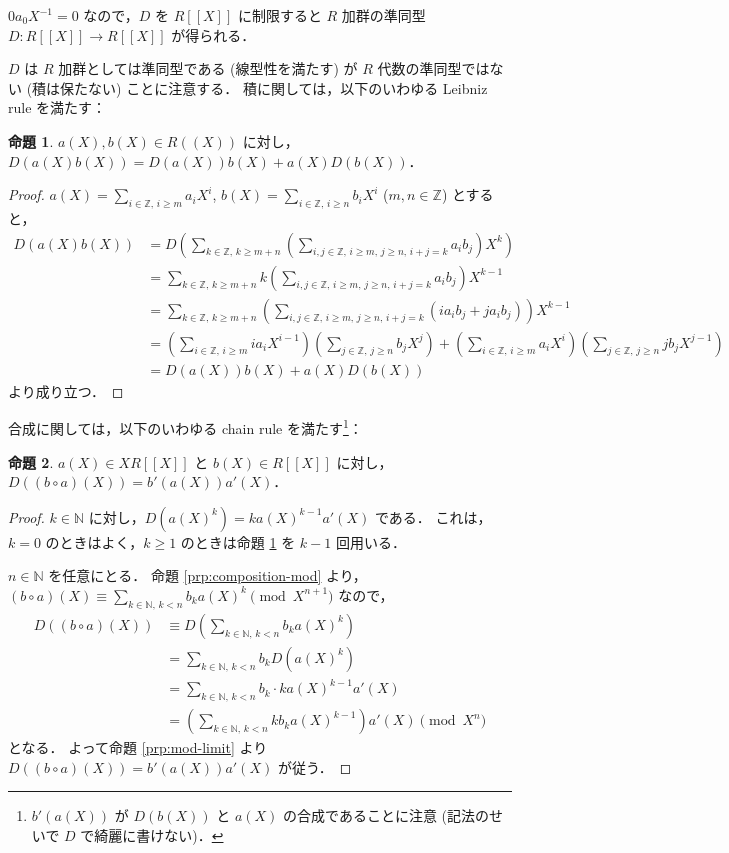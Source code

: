 \documentclass{jsarticle}
\newcommand{\N}{\mathbb{N}}
\newcommand{\Z}{\mathbb{Z}}
\newcommand{\longto}{\longrightarrow}
\theoremstyle{definition}
\newtheorem{Prp}{命題}
\newenvironment{prp}{\vspace{1ex}\begin{screen}\begin{Prp}}{\end{Prp}\end{screen}}
\newenvironment{prf}{\begin{leftbar}\begin{proof}}{\end{proof}\end{leftbar}}
\begin{document}
$0 a_0 X^{-1} = 0$ なので，$D$ を $R[[X]]$ に制限すると
$R$ 加群の準同型 $D\colon R[[X]] \longto R[[X]]$ が得られる．

$D$ は $R$ 加群としては準同型である (線型性を満たす) が
$R$ 代数の準同型ではない (積は保たない) ことに注意する．
積に関しては，以下のいわゆる Leibniz rule を満たす：

\begin{prp}
  \label{prp:leibniz}
  $a(X), b(X) \in R((X))$ に対し，$D(a(X) b(X)) = D(a(X)) b(X) + a(X) D(b(X))$．
\end{prp}
\begin{prf}
  $a(X) = \sum_{i\in\Z,\,i\ge m} a_i X^i$, $b(X) = \sum_{i\in\Z,\,i\ge n} b_i X^i$ ($m, n \in \Z$) とすると，
  \begin{align*}
    D(a(X) b(X))
    &= D\left(\sum_{k\in\Z,\,k\ge m+n} \left(\sum_{i,j\in\Z,\,i\ge m,\,j\ge n,\,i+j=k} a_i b_j\right) X^k\right) \\
    &= \sum_{k\in\Z,\,k\ge m+n} k \left(\sum_{i,j\in\Z,\,i\ge m,\,j\ge n,\,i+j=k} a_i b_j\right) X^{k-1} \\
    &= \sum_{k\in\Z,\,k\ge m+n} \left(\sum_{i,j\in\Z,\,i\ge m,\,j\ge n,\,i+j=k} (i a_i b_j + j a_i b_j)\right) X^{k-1} \\
    &= \left(\sum_{i\in\Z,\,i\ge m} i a_i X^{i-1}\right) \left(\sum_{j\in\Z,\,j\ge n} b_j X^j\right)
        + \left(\sum_{i\in\Z,\,i\ge m} a_i X^i\right) \left(\sum_{j\in\Z,\,j\ge n} j b_j X^{j-1}\right) \\
    &= D(a(X)) b(X) + a(X) D(b(X))
  \end{align*}
  より成り立つ．
\end{prf}

合成に関しては，以下のいわゆる chain rule を満たす\footnote{$b'(a(X))$ が $D(b(X))$ と $a(X)$ の合成であることに注意 (記法のせいで $D$ で綺麗に書けない)．}：

\begin{prp}
  $a(X) \in X R[[X]]$ と $b(X) \in R[[X]]$ に対し，
  $D((b \circ a)(X)) = b'(a(X)) a'(X)$．
\end{prp}
\begin{prf}
  $k \in \N$ に対し，$D(a(X)^k) = k a(X)^{k-1} a'(X)$ である．
  これは，$k = 0$ のときはよく，$k \ge 1$ のときは命題 \ref{prp:leibniz} を $k - 1$ 回用いる．

  $n \in \N$ を任意にとる．
  命題 \ref{prp:composition-mod} より，
  $(b \circ a)(X) \equiv \sum_{k\in\N,\,k<n} b_k a(X)^k \pmod{X^{n+1}}$ なので，
  \begin{align*}
    D((b \circ a)(X))
    &\equiv D\left(\sum_{k\in\N,\,k<n} b_k a(X)^k\right) \\
    &= \sum_{k\in\N,\,k<n} b_k D(a(X)^k) \\
    &= \sum_{k\in\N,\,k<n} b_k \cdot k a(X)^{k-1} a'(X) \\
    &= \left(\sum_{k\in\N,\,k<n} k b_k a(X)^{k-1}\right) a'(X)
    \pmod{X^n}
  \end{align*}
  となる．
  よって命題 \ref{prp:mod-limit} より $D((b \circ a)(X)) = b'(a(X)) a'(X)$ が従う．
\end{prf}
\end{document}

